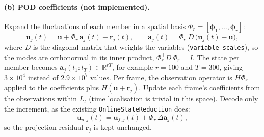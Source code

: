 \documentclass[11pt,a4paper]{article}
\newcommand{\T}{^{\top}}
\newcommand{\R}{\mathbb{R}}
\begin{document}
\paragraph{(b) POD coefficients (not implemented).} Expand the fluctuations of each member in a
spatial basis $\Phi_r = [\bm\phi_1,\dots,\bm\phi_r]$:
\begin{equation}
  \bm u_j(t) = \bar{\bm u} + \Phi_r\,\bm a_j(t) + \bm r_j(t),
  \qquad
  \bm a_j(t) = \Phi_r\T D\,\big(\bm u_j(t) - \bar{\bm u}\big),
\end{equation}
where $D$ is the diagonal matrix that weights the variables
(\texttt{variable\_scales}), so the modes are orthonormal in its inner product,
$\Phi_r\T D\,\Phi_r = I$. The state per member
becomes $\bm a_j(t_1{:}t_T) \in \R^{rT}$, for example $r = 100$ and
$T = 300$, giving $3\times10^4$ instead of $2.9\times10^7$ values. Per frame, the observation
operator is $H\Phi_r$ applied to the coefficients plus $H(\bar{\bm u} + \bm r_j)$.
Update each frame's coefficients from the observations within $L_t$
(time localisation is trivial in this space). Decode only the increment, as
the existing \texttt{OnlineStateReduction} does:
\begin{equation}
  \bm u_{a,j}(t) = \bm u_{f,j}(t) + \Phi_r\,\Delta\bm a_j(t),
\end{equation}
so the projection residual $\bm r_j$ is kept unchanged.
\end{document}
